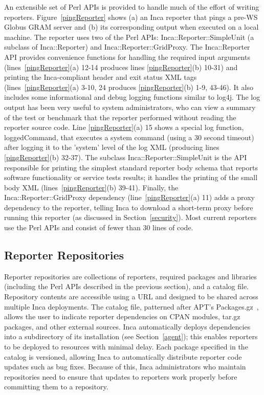 \documentclass{sig-alternate}
\begin{document}
An extensible set of Perl APIs is provided to handle much of the effort of
writing reporters.  Figure~\ref{pingReporter} shows (a) an Inca reporter that
pings a pre-WS Globus GRAM server and (b) its corresponding output when
executed on a local machine.  The reporter uses two of the Perl APIs:
Inca::Reporter::SimpleUnit (a subclass of Inca::Reporter) and
Inca::Reporter::GridProxy.  The Inca::Reporter API provides convenience
functions for handling the required input arguments
(lines~\ref{pingReporter}(a) 12-14 produces lines \ref{pingReporter}(b)
10-31) and printing the Inca-compliant header and exit status XML tags
(lines~\ref{pingReporter}(a) 3-10, 24 produces \ref{pingReporter}(b)
1-9, 43-46).  It also includes some informational and debug logging functions
similar to log4j.  The log output has been very useful to system
administrators, who can view a summary of the test or benchmark that the
reporter performed without reading the reporter source code.  Line
\ref{pingReporter}(a) 15 shows a special log function, loggedCommand, that
executes a system command (using a 30 second timeout) after logging it to the
'system' level of the log XML (producing lines \ref{pingReporter}(b) 32-37).  The subclass
Inca::Reporter::SimpleUnit is the API responsible for printing the simplest
standard reporter body schema that reports software functionality or service
tests results; it handles the printing of the small body XML
(lines~\ref{pingReporter}(b) 39-41).  Finally, the
Inca::Reporter::GridProxy dependency (line~\ref{pingReporter}(a) 11) adds a proxy
dependency to the reporter, telling Inca to download a
short-term proxy before running this reporter (as discussed in
Section~\ref{security}).  Most current reporters use the Perl APIs and consist
of fewer than 30 lines of code.

\subsection{Reporter Repositories}

Reporter repositories are collections of reporters, required
packages and libraries (including the Perl APIs described in the previous
section), and a catalog file.  Repository contents are accessible using a URL
and designed to be shared across multiple Inca deployments.  The catalog file,
patterned after APT's Packages.gz~\cite{apt}, allows the user to indicate
reporter dependencies on CPAN modules, tar.gz packages, and other external
sources.  Inca automatically deploys dependencies into a
subdirectory of its installation (see Section~\ref{agent}); this enables
reporters to be deployed to resources with minimal delay.  Each package
specified in the catalog is versioned, allowing Inca to
automatically distribute reporter code updates such as bug fixes.  Because of
this, Inca administrators who maintain repositories need to ensure
that updates to reporters work properly before committing them to a repository.
\end{document}
